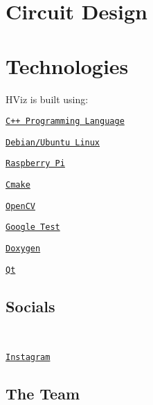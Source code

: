 \section*{Circuit Design}



\section*{Technologies}

H\+Viz is built using\+:


\begin{DoxyItemize}
\item \href{https://www.cplusplus.com/}{\tt C++ Programming Language}
\item \href{https://www.linux.org/}{\tt Debian/\+Ubuntu Linux}
\item \href{https://www.raspberrypi.org}{\tt Raspberry Pi}
\item \href{https://cmake.org/}{\tt Cmake}
\item \href{https://opencv.org/}{\tt Open\+CV}
\item \href{https://github.com/google/googletest}{\tt Google Test}
\item \href{https://www.doxygen.nl/index.html}{\tt Doxygen}
\item \href{https://www.qt.io/}{\tt Qt}
\end{DoxyItemize}

\subsection*{Socials}

\href{https://www.instagram.com/hapticvision_/}{\tt } ~\newline
 ~\newline
 ~\newline
 ~\newline

\begin{DoxyItemize}
\item \href{https://www.instagram.com/hapticvision_/}{\tt Instagram}
\end{DoxyItemize}

\subsection*{The Team}


\begin{DoxyItemize}
\item \href{https://github.com/rdj2829}{\tt }
\item \href{https://github.com/dheerajsankar}{\tt }
\item \href{https://github.com/kprakz}{\tt }
\item \href{https://github.com/josephjoel3099}{\tt }
\end{DoxyItemize}

